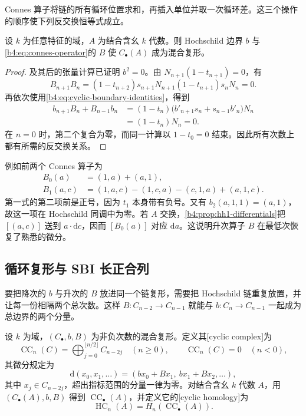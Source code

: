 Connes 算子将链的所有循环位置求和，再插入单位并取一次循环差。这三个操作的顺序使下列反交换恒等式成立。

\begin{proposition}\label{b4:prop:hochschild-mixed-complex}
	设 \(k\) 为任意特征的域，\(A\) 为结合含幺 \(k\) 代数。则 Hochschild 边界 \(b\) 与\eqref{b4:eq:connes-operator}的 \(B\) 使 \(C_\bullet(A)\) 成为混合复形。
\end{proposition}
\begin{proof}
	及其后的张量计算已证明 \(b^2=0\)。由 \(N_{n+1}(1-t_{n+1})=0\)，有
	\[
		B_{n+1}B_n=(1-t_{n+2})s_{n+1}N_{n+1}(1-t_{n+1})s_nN_n=0.
	\]
	再依次使用\eqref{b4:eq:cyclic-boundary-identities}，得到
	\[
		\begin{aligned}
			b_{n+1}B_n+B_{n-1}b_n
			&=(1-t_n)\bigl(b'_{n+1}s_n+s_{n-1}b'_n\bigr)N_n\\
			&=(1-t_n)N_n=0.
		\end{aligned}
	\]
	在 \(n=0\) 时，第二个复合为零，而同一计算以 \(1-t_0=0\) 结束。因此所有次数上都有所需的反交换关系。
\end{proof}

例如前两个 Connes 算子为
\[
	\begin{aligned}
		B_0(a)&=(1,a)+(a,1),\\
		B_1(a,c)&=(1,a,c)-(1,c,a)-(c,1,a)+(a,1,c).
	\end{aligned}
\]
第一式的第二项前是正号，因为 \(t_1\) 本身带有负号。又有 \(b_2(a,1,1)=(a,1)\)，故这一项在 Hochschild 同调中为零。若 \(A\) 交换，\cref{b4:prop:hh1-differentials}把 \([(a,c)]\) 送到 \(a\cdot\mathrm{d}c\)，因而 \([B_0(a)]\) 对应 \(\mathrm{d}a\)。这说明升次算子 \(B\) 在最低次恢复了熟悉的微分。

\subsection{循环复形与 SBI 长正合列}
\label{b4:subsec:1305:02}

要把降次的 \(b\) 与升次的 \(B\) 放进同一个链复形，需要把 Hochschild 链重复放置，并让每一份相隔两个总次数。这样 \(B:C_{n-2}\to C_{n-1}\) 就能与 \(b:C_n\to C_{n-1}\) 一起成为总边界的两个分量。

\begin{definition}\label{b4:def:cyclic-complex}
	设 \(k\) 为域，\((C_\bullet,b,B)\) 为非负次数的混合复形。定义其[cyclic complex]为
	\[
		\operatorname{CC}_n(C)=\bigoplus_{j=0}^{\lfloor n/2\rfloor}C_{n-2j}\quad(n\ge0),\qquad \operatorname{CC}_n(C)=0\quad(n<0),
	\]
	其微分规定为
	\begin{equation}\label{b4:eq:cyclic-total-differential}
		\mathrm{d}(x_0,x_1,\ldots)=(b x_0+B x_1,\ b x_1+B x_2,\ldots),
	\end{equation}
	其中 \(x_j\in C_{n-2j}\)，超出指标范围的分量一律为零。对结合含幺 \(k\) 代数 \(A\)，用 \((C_\bullet(A),b,B)\) 得到 \(\operatorname{CC}_\bullet(A)\)，并定义它的[cyclic homology]为
	\[
		\operatorname{HC}_n(A)=H_n(\operatorname{CC}_\bullet(A)).
	\]
\end{definition}

